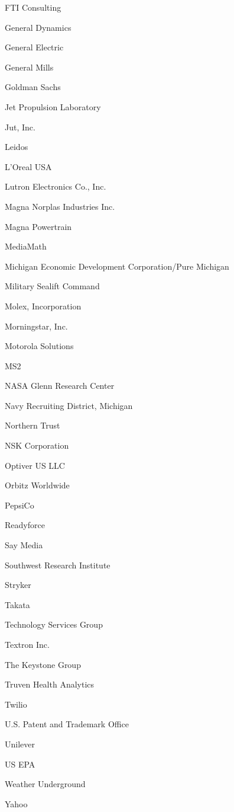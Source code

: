 \documentclass[twoside]{article}
\begin{document}
\begin{center}
\begin{multicols}{5}
\begin{FlushLeft}
\begin{compactitem}
\item FTI Consulting
\item General Dynamics
\item General Electric
\item General Mills
\item Goldman Sachs
\item Jet Propulsion Laboratory
\item Jut, Inc.
\item Leidos
\item L'Oreal USA
\item Lutron Electronics Co., Inc.
\item Magna Norplas Industries Inc.
\item Magna Powertrain
\item MediaMath
\item Michigan Economic Development Corporation/Pure Michigan
\item Military Sealift Command
\item Molex, Incorporation
\item Morningstar, Inc.
\item Motorola Solutions
\item MS2
\item NASA Glenn Research Center
\item Navy Recruiting District, Michigan
\item Northern Trust
\item NSK Corporation
\item Optiver US LLC
\item Orbitz Worldwide
\item PepsiCo
\item Readyforce
\item Say Media
\item Southwest Research Institute
\item Stryker
\item Takata
\item Technology Services Group
\item Textron Inc.
\item The Keystone Group
\item Truven Health Analytics
\item Twilio
\item U.S. Patent and Trademark Office
\item Unilever
\item US EPA
\item Weather Underground
\item Yahoo

\end{compactitem}
\end{FlushLeft}
\end{multicols}
\end{center}
\end{document}
